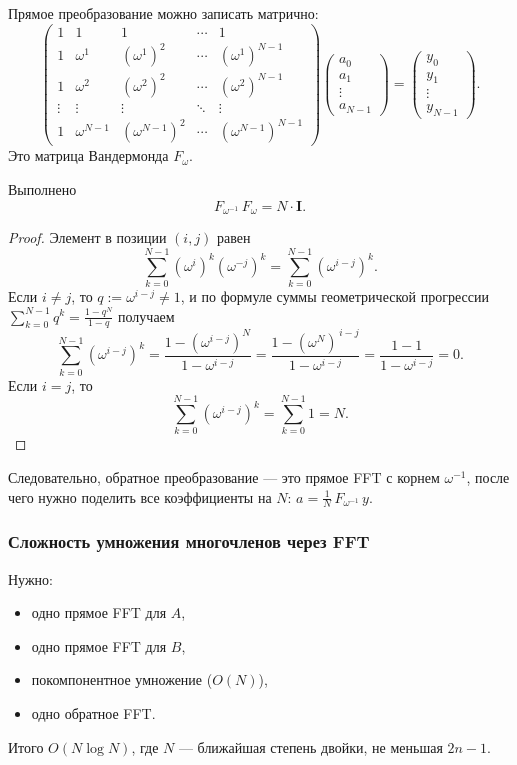 Прямое преобразование можно записать матрично:
\[
\begin{pmatrix}
	1 & 1 & 1 & \cdots & 1 \\
	1 & \omega^1 & (\omega^1)^2 & \cdots & (\omega^1)^{N-1} \\
	1 & \omega^2 & (\omega^2)^2 & \cdots & (\omega^2)^{N-1} \\
	\vdots & \vdots & \vdots & \ddots & \vdots \\
	1 & \omega^{N-1} & (\omega^{N-1})^2 & \cdots & (\omega^{N-1})^{N-1}
\end{pmatrix}
\begin{pmatrix}
	a_0\\ a_1\\ \vdots\\ a_{N-1}
\end{pmatrix}
=
\begin{pmatrix}
	y_0\\ y_1\\ \vdots\\ y_{N-1}
\end{pmatrix}.
\]
Это матрица Вандермонда $F_\omega$.

\begin{Statement}{}{}
	Выполнено
	\[
	F_{\omega^{-1}}\,F_\omega = N\cdot \mathbf{I}.
	\]
\end{Statement}

\begin{proof}
	Элемент в позиции $(i,j)$ равен
	\[
	\sum_{k=0}^{N-1}(\omega^i)^k(\omega^{-j})^k
	=\sum_{k=0}^{N-1}(\omega^{i-j})^k.
	\]
	Если $i\neq j$, то $q:=\omega^{i-j}\neq 1$, и по формуле суммы геометрической прогрессии $\sum_{k=0}^{N-1} q^k=\frac{1-q^N}{1-q}$
	получаем
	\[
	\sum_{k=0}^{N-1}(\omega^{i-j})^k
	=\frac{1-(\omega^{i-j})^N}{1-\omega^{i-j}}
	=\frac{1-(\omega^N)^{\,i-j}}{1-\omega^{i-j}}
	=\frac{1-1}{1-\omega^{i-j}}=0.
	\]
	Если $i=j$, то
	\[
	\sum_{k=0}^{N-1}(\omega^{i-j})^k=\sum_{k=0}^{N-1}1=N.
	\]
\end{proof}

Следовательно, обратное преобразование — это прямое FFT с корнем $\omega^{-1}$,
после чего нужно поделить все коэффициенты на $N$: $a = \frac{1}{N}\,F_{\omega^{-1}}\,y.$


\subsubsection*{Сложность умножения многочленов через FFT}

Нужно:
\begin{itemize}
	\item одно прямое FFT для $A$,
	\item одно прямое FFT для $B$,
	\item покомпонентное умножение ($O(N)$),
	\item одно обратное FFT.
\end{itemize}
Итого $O(N\log N)$, где $N$ — ближайшая степень двойки, не меньшая $2n-1$.

